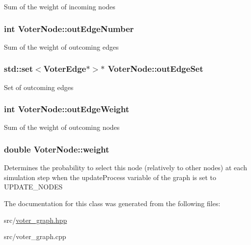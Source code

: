 Sum of the weight of incoming nodes \hypertarget{classVoterNode_ad02a5823353dd4f1e0a1b9965553a1ef}{
\subsubsection[{out\-Edge\-Number}]{\setlength{\rightskip}{0pt plus 5cm}int Voter\-Node\-::out\-Edge\-Number}}\label{classVoterNode_ad02a5823353dd4f1e0a1b9965553a1ef}
Sum of the weight of outcoming edges \hypertarget{classVoterNode_abbeb36b008f12217d080f9eb287ae9de}{
\subsubsection[{out\-Edge\-Set}]{\setlength{\rightskip}{0pt plus 5cm}std\-::set$<${\bf Voter\-Edge}$\ast$$>$$\ast$ Voter\-Node\-::out\-Edge\-Set}}\label{classVoterNode_abbeb36b008f12217d080f9eb287ae9de}
Set of outcoming edges \hypertarget{classVoterNode_ae092216c9048f14155b2e580236ab6a9}{
\subsubsection[{out\-Edge\-Weight}]{\setlength{\rightskip}{0pt plus 5cm}int Voter\-Node\-::out\-Edge\-Weight}}\label{classVoterNode_ae092216c9048f14155b2e580236ab6a9}
Sum of the weight of outcoming nodes \hypertarget{classVoterNode_a06aa43e2603a2c8ee7540c754ef1fce2}{
\subsubsection[{weight}]{\setlength{\rightskip}{0pt plus 5cm}double Voter\-Node\-::weight}}\label{classVoterNode_a06aa43e2603a2c8ee7540c754ef1fce2}
Determines the probability to select this node (relatively to other nodes) at each simulation step when the update\-Process variable of the graph is set to U\-P\-D\-A\-T\-E\-\_\-\-N\-O\-D\-E\-S 

The documentation for this class was generated from the following files\-:\begin{DoxyCompactItemize}
\item 
src/\hyperlink{voter__graph_8hpp}{voter\-\_\-graph.\-hpp}\item 
src/voter\-\_\-graph.\-cpp\end{DoxyCompactItemize}
